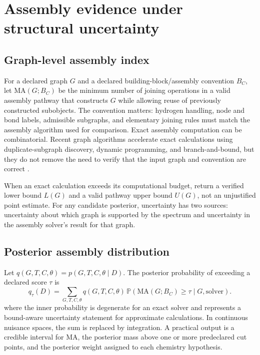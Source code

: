 \documentclass[10pt,a4paper]{article}
\newcommand{\MA}{\mathrm{MA}}
\newcommand{\Prb}{\mathbb{P}}
\begin{document}
\section{Assembly evidence under structural uncertainty}
\subsection{Graph-level assembly index}
For a declared graph $G$ and a declared building-block/assembly convention $B_C$, let $\MA(G;B_C)$ be the minimum number of joining operations in a valid assembly pathway that constructs $G$ while allowing reuse of previously constructed subobjects. The convention matters: hydrogen handling, node and bond labels, admissible subgraphs, and elementary joining rules must match the assembly algorithm used for comparison. Exact assembly computation can be combinatorial. Recent graph algorithms accelerate exact calculations using duplicate-subgraph discovery, dynamic programming, and branch-and-bound, but they do not remove the need to verify that the input graph and convention are correct \cite{Seet2025Assembly}.

When an exact calculation exceeds its computational budget, return a verified lower bound $L(G)$ and a valid pathway upper bound $U(G)$, not an unjustified point estimate. For any candidate posterior, uncertainty has two sources: uncertainty about which graph is supported by the spectrum and uncertainty in the assembly solver's result for that graph.

\subsection{Posterior assembly distribution}
Let $q(G,T,C,\theta)=p(G,T,C,\theta\mid D)$. The posterior probability of exceeding a declared score $\tau$ is
\begin{equation}
 q_{\tau}(D)=\sum_{G,T,C,\theta}q(G,T,C,\theta)\,\Prb\!\left(\MA(G;B_C)\geq\tau\mid G,\text{solver}\right).
 \label{eq:qthreshold}
\end{equation}
where the inner probability is degenerate for an exact solver and represents a bound-aware uncertainty statement for approximate calculations. In continuous nuisance spaces, the sum is replaced by integration. A practical output is a credible interval for $\MA$, the posterior mass above one or more predeclared cut points, and the posterior weight assigned to each chemistry hypothesis.
\end{document}
